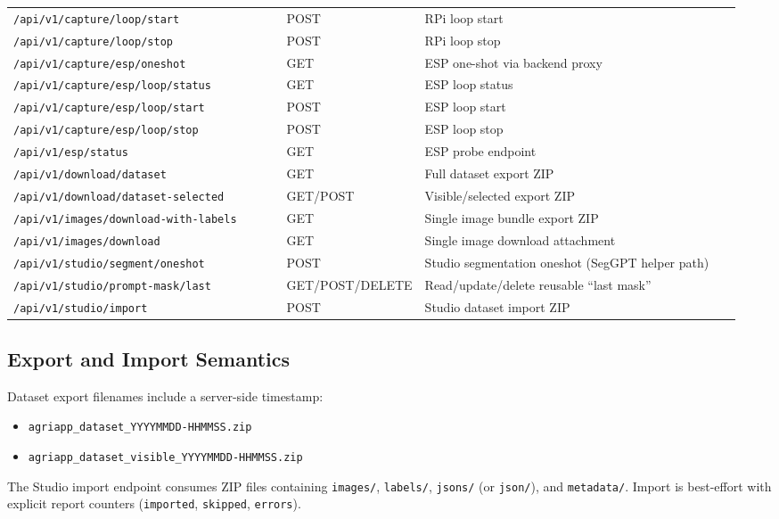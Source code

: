 \begin{longtable}{p{0.38\linewidth} p{0.12\linewidth} p{0.45\linewidth}}
\texttt{/api/v1/capture/loop/start} & POST & RPi loop start \\
\texttt{/api/v1/capture/loop/stop} & POST & RPi loop stop \\
\texttt{/api/v1/capture/esp/oneshot} & GET & ESP one-shot via backend proxy \\
\texttt{/api/v1/capture/esp/loop/status} & GET & ESP loop status \\
\texttt{/api/v1/capture/esp/loop/start} & POST & ESP loop start \\
\texttt{/api/v1/capture/esp/loop/stop} & POST & ESP loop stop \\
\texttt{/api/v1/esp/status} & GET & ESP probe endpoint \\
\texttt{/api/v1/download/dataset} & GET & Full dataset export ZIP \\
\texttt{/api/v1/download/dataset-selected} & GET/POST & Visible/selected export ZIP \\
\texttt{/api/v1/images/download-with-labels} & GET & Single image bundle export ZIP \\
\texttt{/api/v1/images/download} & GET & Single image download attachment \\
\texttt{/api/v1/studio/segment/oneshot} & POST & Studio segmentation oneshot (SegGPT helper path) \\
\texttt{/api/v1/studio/prompt-mask/last} & GET/POST/DELETE & Read/update/delete reusable ``last mask'' \\
\texttt{/api/v1/studio/import} & POST & Studio dataset import ZIP \\
\bottomrule
\end{longtable}

\subsection{Export and Import Semantics}
Dataset export filenames include a server-side timestamp:
\begin{itemize}
  \item \texttt{agriapp\_dataset\_YYYYMMDD-HHMMSS.zip}
  \item \texttt{agriapp\_dataset\_visible\_YYYYMMDD-HHMMSS.zip}
\end{itemize}

The Studio import endpoint consumes ZIP files containing \texttt{images/}, \texttt{labels/}, \texttt{jsons/} (or \texttt{json/}), and \texttt{metadata/}. Import is best-effort with explicit report counters (\texttt{imported}, \texttt{skipped}, \texttt{errors}).

